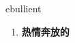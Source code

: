 
\begin{frame}
{\huge ebullient}
\begin{center}
\begin{enumerate}\Large
  \item \textbf{热情奔放的}
\end{enumerate}
\end{center}
\end{frame}
